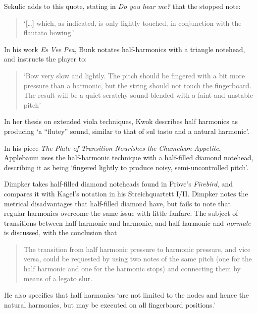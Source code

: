 Sekulic adds to this quote, stating in \emph{Do you hear me?} that the stopped note:
\begin{quotation}
  `[\ldots] which, as indicated, is only lightly touched, in conjunction with the flautato bowing.'\autocite[28]{sekulicYouHearMe2012}
\end{quotation}

In his work \emph{Es Vee Pea}, Bunk notates half-harmonics with a triangle notehead, and instructs the player to: \begin{quotation}
  `Bow very slow and lightly. The pitch should be fingered with a bit more pressure than a harmonic, but the string should not touch the fingerboard. 
  The result will be a quiet scratchy sound blended with a faint and unstable pitch'
\end{quotation}\autocite[]{bunkEsVeePea2002}

In her thesis on extended viola techniques, Kwok describes half harmonics as producing `a “flutey” sound, similar to that of sul tasto and a natural harmonic'.\autocite[]{kwokBreakingSoundBarriers2018}

In his piece \emph{The Plate of Transition Nourishes the Chameleon Appetite}, Applebaum uses the half-harmonic technique with a half-filled diamond notehead, describing it as being `fingered lightly to produce noisy, semi-uncontrolled pitch'.\autocite[]{applebaumPlateTransitionNourishes1992}

Dimpker takes half-filled diamond noteheads found in Pröve's \emph{Firebird}, and compares it with Kagel's notation in his Streichquartett I/II.\autocite[120-121]{dimpkerExtendedNotationDepiction2012}
Dimpker notes the metrical disadvantages that half-filled diamond have, but fails to note that regular harmonics overcome the same issue with little fanfare.
The subject of transitions between half harmonic and harmonic, and half harmonic and \emph{normale} is discussed, with the conclusion that 
\begin{quotation}
  The transition from half harmonic pressure to harmonic pressure, and vice versa, could be requested by using two notes of the same pitch (one for the half harmonic and one for the harmonic stops) and connecting them by means of a legato slur.\autocite[121]{dimpkerExtendedNotationDepiction2012}
\end{quotation}
He also specifies that half harmonics `are not limited to the nodes and hence the natural harmonics, but may be executed on all fingerboard positions.'\autocite[121]{dimpkerExtendedNotationDepiction2012}

